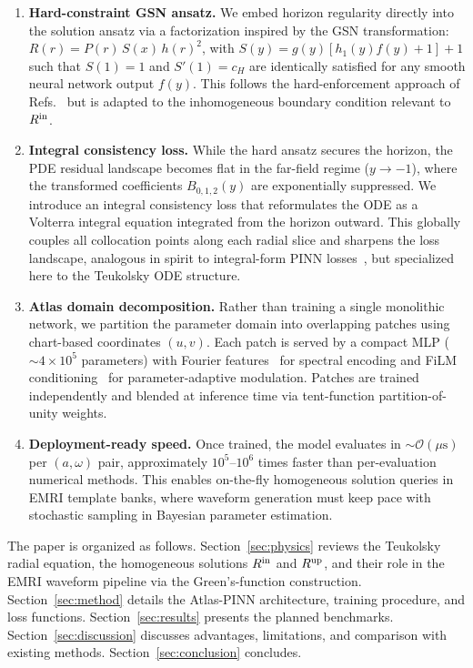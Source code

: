 \documentclass[aps,prd,twocolumn,superscriptaddress,nofootinbib]{revtex4-2}
\begin{document}
\begin{enumerate}
  \item \textbf{Hard-constraint GSN ansatz.} We embed horizon regularity
  directly into the solution ansatz via a factorization inspired by the GSN
  transformation: $R(r) = P(r)\,S(x)\,h(r)^2$, with $S(y) = g(y)[h_1(y)f(y)
  + 1] + 1$ such that $S(1)=1$ and $S'(1)=c_H$ are identically satisfied for
  any smooth neural network output $f(y)$.  This follows the hard-enforcement
  approach of Refs.~\cite{Luna:2022pinn,Pombo:2025tbyd} but is adapted to
  the inhomogeneous boundary condition relevant to $R^{\rm in}$.

  \item \textbf{Integral consistency loss.} While the hard ansatz secures the
  horizon, the PDE residual landscape becomes flat in the far-field regime
  ($y\to -1$), where the transformed coefficients $B_{0,1,2}(y)$ are
  exponentially suppressed.  We introduce an integral consistency loss that
  reformulates the ODE as a Volterra integral equation integrated from the
  horizon outward.  This globally couples all collocation points along each
  radial slice and sharpens the loss landscape, analogous in spirit to
  integral-form PINN losses~\cite{Saleh:2024integralloss}, but specialized here
  to the Teukolsky ODE structure.

  \item \textbf{Atlas domain decomposition.} Rather than training a single
  monolithic network, we partition the parameter domain into overlapping patches
  using chart-based coordinates $(u,v)$.  Each patch is served by a compact MLP
  ($\sim 4\times 10^{5}$ parameters) with Fourier
  features~\cite{Tancik:2020fourier} for spectral encoding and FiLM
  conditioning~\cite{Perez:2018film} for parameter-adaptive modulation.
  Patches are trained independently and blended at inference time via
  tent-function partition-of-unity weights.

  \item \textbf{Deployment-ready speed.} Once trained, the model evaluates in
  $\sim \mathcal{O}(\mu\mathrm{s})$ per $(a,\omega)$ pair, approximately
  $10^{5}$--$10^{6}$ times faster than per-evaluation numerical methods.  This
  enables on-the-fly homogeneous solution queries in EMRI template banks, where
  waveform generation must keep pace with stochastic sampling in Bayesian
  parameter estimation.
\end{enumerate}

The paper is organized as follows.  Section~\ref{sec:physics} reviews the
Teukolsky radial equation, the homogeneous solutions $R^{\rm in}$ and
$R^{\rm up}$, and their role in the EMRI waveform pipeline via the
Green's-function construction.  Section~\ref{sec:method} details the Atlas-PINN
architecture, training procedure, and loss functions.
Section~\ref{sec:results} presents the planned benchmarks.
Section~\ref{sec:discussion} discusses advantages, limitations, and comparison
with existing methods.  Section~\ref{sec:conclusion} concludes.
\end{document}
